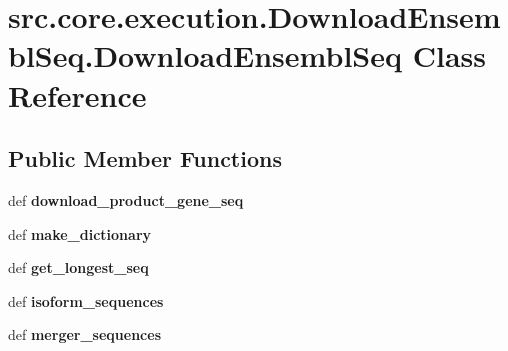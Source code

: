 \hypertarget{classsrc_1_1core_1_1execution_1_1DownloadEnsemblSeq_1_1DownloadEnsemblSeq}{\section{src.\-core.\-execution.\-Download\-Ensembl\-Seq.\-Download\-Ensembl\-Seq Class Reference}
\label{classsrc_1_1core_1_1execution_1_1DownloadEnsemblSeq_1_1DownloadEnsemblSeq}
}
\subsection*{Public Member Functions}
\begin{DoxyCompactItemize}
\item 
\hypertarget{classsrc_1_1core_1_1execution_1_1DownloadEnsemblSeq_1_1DownloadEnsemblSeq_a1874fd8859a6fc500d8511d27509124c}{def {\bfseries download\-\_\-product\-\_\-gene\-\_\-seq}}\label{classsrc_1_1core_1_1execution_1_1DownloadEnsemblSeq_1_1DownloadEnsemblSeq_a1874fd8859a6fc500d8511d27509124c}

\item 
\hypertarget{classsrc_1_1core_1_1execution_1_1DownloadEnsemblSeq_1_1DownloadEnsemblSeq_af36a9c6e46959bdaf0a98ab2c021825c}{def {\bfseries make\-\_\-dictionary}}\label{classsrc_1_1core_1_1execution_1_1DownloadEnsemblSeq_1_1DownloadEnsemblSeq_af36a9c6e46959bdaf0a98ab2c021825c}

\item 
\hypertarget{classsrc_1_1core_1_1execution_1_1DownloadEnsemblSeq_1_1DownloadEnsemblSeq_a20dc7983a7ea0e7c2cd49f6600ce9a09}{def {\bfseries get\-\_\-longest\-\_\-seq}}\label{classsrc_1_1core_1_1execution_1_1DownloadEnsemblSeq_1_1DownloadEnsemblSeq_a20dc7983a7ea0e7c2cd49f6600ce9a09}

\item 
\hypertarget{classsrc_1_1core_1_1execution_1_1DownloadEnsemblSeq_1_1DownloadEnsemblSeq_ad574c6879c68d335e8157f19300967ff}{def {\bfseries isoform\-\_\-sequences}}\label{classsrc_1_1core_1_1execution_1_1DownloadEnsemblSeq_1_1DownloadEnsemblSeq_ad574c6879c68d335e8157f19300967ff}

\item 
\hypertarget{classsrc_1_1core_1_1execution_1_1DownloadEnsemblSeq_1_1DownloadEnsemblSeq_ad430eda7b94bc924025db0727f46f460}{def {\bfseries merger\-\_\-sequences}}\label{classsrc_1_1core_1_1execution_1_1DownloadEnsemblSeq_1_1DownloadEnsemblSeq_ad430eda7b94bc924025db0727f46f460}

\end{DoxyCompactItemize}
